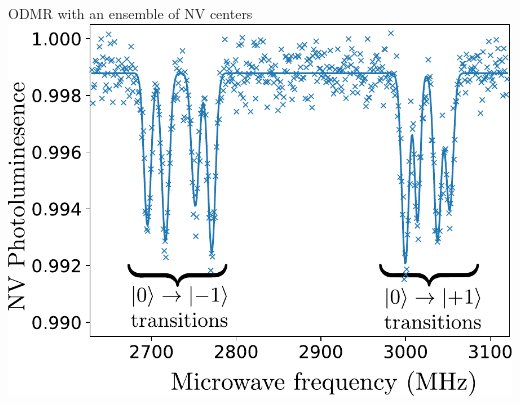 \documentclass{beamer}
\begin{document}
\begin{frame}{ODMR with an ensemble of NV centers}
\includegraphics[scale=.65]{ESR_4spin_simu}
\end{frame}
\end{document}

